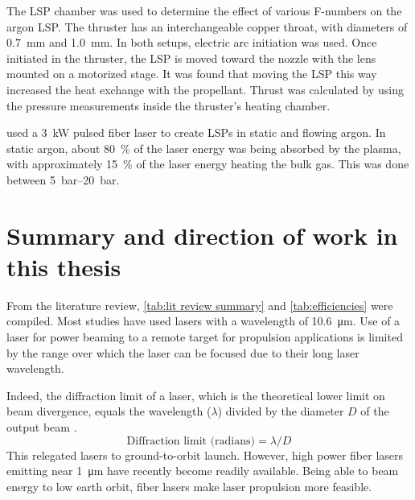         The LSP chamber was used to determine the effect of various F-numbers on the argon LSP. The thruster has an interchangeable copper throat, with diameters of \qty{0.7}{mm} and \qty{1.0}{mm}. In both setups, electric arc initiation was used. Once initiated in the thruster, the LSP is moved toward the nozzle with the lens mounted on a motorized stage. It was found that moving the LSP this way increased the heat exchange with the propellant. Thrust was calculated by using the pressure measurements inside the thruster's heating chamber.


        \textcite{duplayArgonLaserPlasmaThruster2024a} used a \qty{3}{kW} pulsed fiber laser to create LSPs in static and flowing argon. In static argon, about \qty{80}{\%} of the laser energy was being absorbed by the plasma, with approximately \qty{15}{\%} of the laser energy heating the bulk gas. This was done between \qtyrange{5}{20}{bar}.

    \section{Summary and direction of work in this thesis}
        
        From the literature review, \autoref{tab:lit review summary} and \autoref{tab:efficiencies} were compiled. Most studies have used  lasers with a wavelength of \qty{10.6}{μm}. Use of a  laser for power beaming to a remote target for propulsion applications is limited by the range over which the laser can be focused due to their long laser wavelength. 
    
        Indeed, the diffraction limit of a laser, which is the theoretical lower limit on beam divergence, equals the wavelength ($\lambda$) divided by the diameter $D$ of the output beam \cite{hechtUnderstandingLasersEntry2019}.
        \[
        \text{Diffraction limit (radians)} = \lambda/D
        \]
        This relegated  lasers to ground-to-orbit launch. However, high power fiber lasers emitting near \qty{1}{μm} have recently become readily available. Being able to beam energy to low earth orbit, fiber lasers make laser propulsion more feasible.

